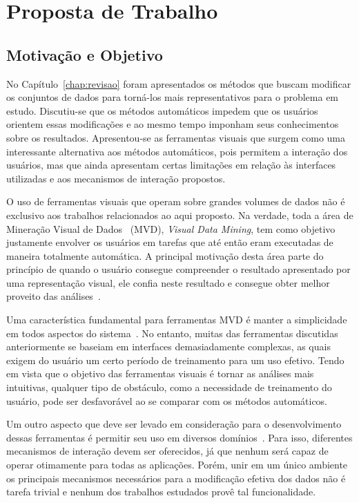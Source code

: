 \chapter{Proposta de Trabalho}\label{chap:proposta}

\section{Motivação e Objetivo}

No Capítulo~\ref{chap:revisao} foram apresentados os métodos
que buscam modificar os conjuntos de dados para torná-los
mais representativos para o problema em estudo.  Discutiu-se
que os métodos automáticos impedem que os usuários orientem
essas modificações e ao mesmo tempo imponham seus
conhecimentos sobre os resultados.  Apresentou-se as
ferramentas visuais que surgem como uma interessante
alternativa aos métodos automáticos, pois permitem a
interação dos usuários, mas que ainda apresentam certas
limitações em relação às interfaces utilizadas e aos
mecanismos de interação propostos.

O uso de ferramentas visuais que operam sobre grandes
volumes de dados não é exclusivo aos trabalhos relacionados
ao aqui proposto. Na verdade, toda a área de
Mineração Visual de Dados~\cite{Wong1999} (MVD),
\emph{Visual Data Mining}, tem como objetivo justamente
envolver os usuários em tarefas que até então eram
executadas de maneira totalmente automática. A principal
motivação desta área parte do princípio de quando o usuário
consegue compreender o resultado apresentado por uma
representação visual, ele confia neste resultado e
consegue obter melhor proveito das análises~\cite{Wong1999}.

Uma característica fundamental para ferramentas MVD é manter
a simplicidade em todos aspectos do sistema~\cite{Wong1999}.
No entanto, muitas das ferramentas discutidas anteriormente
se baseiam em interfaces demasiadamente complexas, as quais
exigem do usuário um certo período de treinamento para um
uso efetivo. Tendo em vista que o objetivo das ferramentas
visuais é tornar as análises mais intuitivas, qualquer tipo
de obstáculo, como a necessidade de treinamento do usuário,
pode ser desfavorável ao se comparar com os métodos
automáticos.

Um outro aspecto que deve ser levado em consideração para o
desenvolvimento dessas ferramentas é permitir seu uso em
diversos domínios~\cite{Wong1999}. Para isso, diferentes
mecanismos de interação devem ser oferecidos, já que nenhum
será capaz de operar otimamente para todas as
aplicações. Porém, unir em um único ambiente os principais
mecanismos necessários para a modificação efetiva dos dados
não é tarefa trivial e nenhum dos trabalhos estudados provê
tal funcionalidade.


